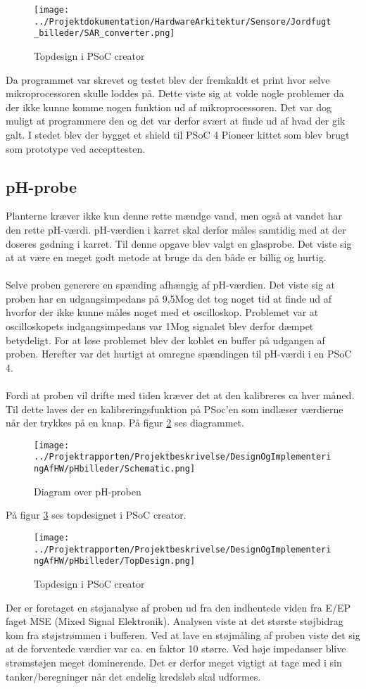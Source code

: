 \begin{figure}[H]
	\centering 
	\texttt{[image: ../Projektdokumentation/HardwareArkitektur/Sensore/Jordfugt\_billeder/SAR\_converter.png]}
	\caption{Topdesign i PSoC creator}
	\label{photo:PSoC_Creator}
\end{figure} 

Da programmet var skrevet og testet blev der fremkaldt et print hvor selve mikroprocessoren skulle loddes på. Dette viste sig at volde nogle problemer da der ikke kunne komme nogen funktion ud af mikroprocessoren. Det var dog muligt at programmere den og det var derfor svært at finde ud af hvad der gik galt. I stedet blev der bygget et shield til PSoC 4 Pioneer kittet som blev brugt som prototype ved accepttesten. 

\subsection{pH-probe}
Planterne kræver ikke kun denne rette mændge vand, men også at vandet har den rette pH-værdi. pH-værdien i karret skal derfor måles samtidig med at der doseres gødning i karret. Til denne opgave blev valgt en glasprobe. Det viste sig at at være en meget godt metode at bruge da den både er billig og hurtig.
\\\\
Selve proben generere en spænding afhængig af pH-værdien. Det viste sig at proben har en udgangsimpedans på 9,5M\ohm og det tog noget tid at finde ud af hvorfor der ikke kunne måles noget med et oscilloskop. Problemet var at oscilloskopets indgangsimpedans var 1M\ohm og signalet blev derfor dæmpet betydeligt. For at løse problemet blev der koblet en buffer på udgangen af proben. Herefter var det hurtigt at omregne spændingen til pH-værdi i en PSoC 4. 
\\\\
Fordi at proben vil drifte med tiden kræver det at den kalibreres ca hver måned. Til dette laves der en kalibreringsfunktion på PSoc'en som indlæser værdierne når der trykkes på en knap. På figur \ref{photo:Schematic_ph} ses diagrammet.

\begin{figure}[H]
	\centering 
	\texttt{[image: ../Projektrapporten/Projektbeskrivelse/DesignOgImplementeringAfHW/pHbilleder/Schematic.png]}
	\caption{Diagram over pH-proben}
	\label{photo:Schematic_ph}
\end{figure} 
På figur \ref{photo:PSoC_Creator_ph} ses topdesignet i PSoC creator.
\begin{figure}[H]
	\centering 
	\texttt{[image: ../Projektrapporten/Projektbeskrivelse/DesignOgImplementeringAfHW/pHbilleder/TopDesign.png]}
	\caption{Topdesign i PSoC creator}
	\label{photo:PSoC_Creator_ph}
\end{figure} 
Der er foretaget en støjanalyse af proben ud fra den indhentede viden fra E/EP faget MSE (Mixed Signal Elektronik). Analysen viste at det største støjbidrag kom fra støjstrømmen i bufferen. Ved at lave en støjmåling af proben viste det sig at de forventede værdier var ca. en faktor 10 større. Ved høje impedanser blive strømstøjen meget dominerende. Det er derfor meget vigtigt at tage med i sin tanker/beregninger når det endelig kredsløb skal udformes.

